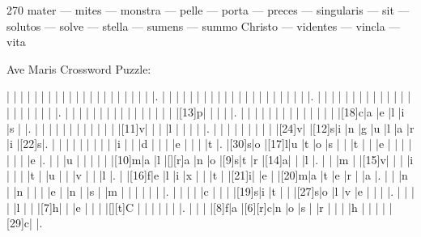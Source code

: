 \documentclass[12pt]{article}
\begin{document}
\pagestyle{fancy}
\fancyhf{}
\renewcommand{\headrulewidth}{0pt}
\renewcommand{\footrulewidth}{0pt}
\libertine
\renewcommand\PuzzleClueFont{\rm\normalsize}
\noindent\begin{rotate}{0}
\small
\end{rotate}
\hfill
\begin{rotate}{270}
\small
mater --- mites --- monstra --- pelle --- porta --- preces --- singularis --- sit --- solutos --- solve --- stella --- sumens --- summo Christo --- videntes --- vincla --- vita 
\end{rotate}
\begin{center}
  \huge{Ave Maris Crossword Puzzle:}
\end{center}
\vspace{1.5cm}
\begin{Puzzle}{22}{24}
  |{}  |{}  |{}  |{}  |{}  |{}  |{}  |{}  |{}  |{}  |{}  |{}  |{}  |{}  |{}  |{}  |{}  |{}  |{}  |{}  |{}  |.
  |{}  |{}  |{}  |{}  |{}  |{}  |{}  |{}  |{}  |{}  |{}  |{}  |{}  |{}  |{}  |{}  |{}  |{}  |{}  |{}  |{}  |.
  |{}  |{}  |{}  |{}  |{}  |{}  |{}  |{}  |{}  |{}  |{}  |{}  |{}  |{}  |{}  |{}  |{}  |{}  |{}  |{}  |{}  |.
  |{}  |{}  |{}  |{}  |{}  |{}  |{}  |{}  |{}  |{}  |{}  |{}  |{}  |{}  |{}  |{}  |[13]p|{}  |{}  |{}  |{}  |.
  |{}  |{}  |{}  |{}  |{}  |{}  |{}  |{}  |{}  |{}  |{}  |{}  |{}  |{}  |[18]c|a   |e   |l   |i   |s   |{}  |.
  |{}  |{}  |{}  |{}  |{}  |{}  |{}  |{}  |{}  |{}  |{}  |{}  |[11]v|{}  |{}  |{}  |l   |{}  |{}  |{}  |{}  |.
  |{}  |{}  |{}  |{}  |{}  |{}  |{}  |{}  |{}  |[24]v|{}  |[12]s|i   |n   |g   |u   |l   |a   |r   |i   |[22]s|.
  |{}  |{}  |{}  |{}  |{}  |{}  |{}  |{}  |{}  |i   |{}  |{}  |d   |{}  |{}  |{}  |e   |{}  |{}  |{}  |t   |.
  |[30]s|o   |[17]l|u   |t   |o   |s   |{}  |{}  |t   |{}  |{}  |e   |{}  |{}  |{}  |{}  |{}  |{}  |{}  |e   |.
  |{}  |{}  |u   |{}  |{}  |{}  |{}  |{}  |[10]m|a   |l   |[][r]a   |n   |o   |[9]s|t   |r   |[14]a|{}  |{}  |l   |.
  |{}  |{}  |m   |{}  |[15]v|{}  |{}  |{}  |i   |{}  |{}  |{}  |t   |{}  |u   |{}  |{}  |v   |{}  |{}  |l   |.
  |{}  |[16]f|e   |l   |i   |x   |{}  |{}  |t   |{}  |[21]i|{}  |e   |{}  |[20]m|a   |t   |e   |r   |{}  |a   |.
  |{}  |{}  |n   |{}  |n   |{}  |{}  |{}  |e   |{}  |n   |{}  |s   |{}  |m   |{}  |{}  |{}  |{}  |{}  |{}  |.
  |{}  |{}  |{}  |{}  |c   |{}  |{}  |{}  |[19]s|i   |t   |{}  |{}  |[27]s|o   |l   |v   |e   |{}  |{}  |{}  |.
  |{}  |{}  |{}  |{}  |l   |{}  |{}  |[7]h|{}  |{}  |e   |{}  |{}  |{}  |[][t]C   |{}  |{}  |{}  |{}  |{}  |{}  |.
  |{}  |{}  |{}  |[8]f|a   |[6][r]c|n   |o   |s   |{}  |r   |{}  |{}  |{}  |h   |{}  |{}  |{}  |{}  |[29]c|{}  |.

\end{Puzzle}
\end{document}
